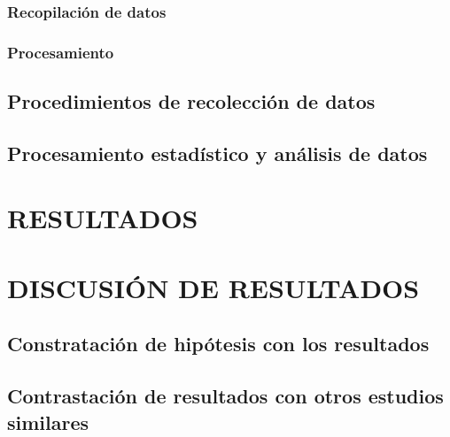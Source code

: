 \documentclass[12pt,a4paper,oneside]{report}
\begin{document}
\subsection{Recopilación de datos}

\subsection{Procesamiento}

\section{Procedimientos de recolección de datos}

\section{Procesamiento estadístico y análisis de datos}


\chapter{RESULTADOS}


\chapter{DISCUSIÓN DE RESULTADOS}

\section{Constratación de hipótesis con los resultados}

\section{Contrastación de resultados con otros estudios similares}

\end{document}
